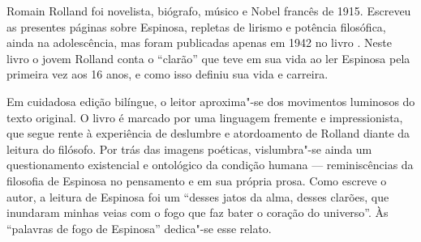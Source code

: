 \hspace*{-7cm}\hrulefill\hspace*{-7cm}

\medskip

\noindent{}Romain Rolland foi novelista, biógrafo, músico e Nobel francês de 1915. Escreveu as presentes páginas sobre Espinosa, repletas de lirismo e potência filosófica, ainda na adolescência, mas foram publicadas apenas em 1942 no livro {}. Neste livro o jovem Rolland conta o “clarão” que teve em sua vida ao ler Espinosa pela primeira vez aos 16 anos, e como isso definiu sua vida e carreira.

Em cuidadosa edição bilíngue, o leitor aproxima"-se dos movimentos luminosos do texto original. O livro é marcado por uma linguagem fremente e impressionista, que segue rente à experiência de deslumbre e atordoamento de Rolland diante da leitura do filósofo. Por trás das imagens poéticas, vislumbra"-se ainda um questionamento existencial e ontológico da condição humana --- reminiscências da filosofia de Espinosa no pensamento e em sua própria prosa. Como escreve o autor, a leitura de Espinosa foi um “desses jatos da alma, desses clarões, que inundaram minhas veias com o fogo que faz bater o coração do universo”. Às “palavras de fogo de Espinosa” dedica"-se esse relato.

\vfill

\hspace*{-.4cm}\begin{minipage}[c]{.5\linewidth}
\small{
{}}
\end{minipage}

\pagebreak

\hspace{.5cm}

